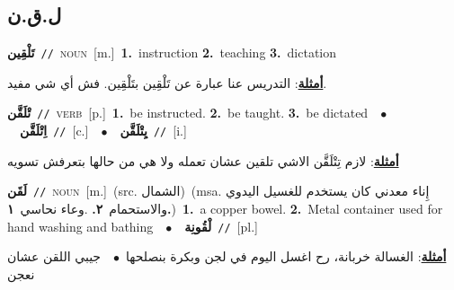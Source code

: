 \documentclass[10pt,a4paper,twoside]{article} %
\begin{document}
\begin{multicols}{2}
\vspace{-3mm}
\subsection*{\color{blue}\foreignlanguage{arabic}{ل.ق.ن}\color{blue}{}} 

{\setlength\topsep{0pt}\textbf{\foreignlanguage{arabic}{تَلْقِين}}\ {\color{gray}\texttt{//}\color{black}}\ \textsc{noun}\ [m.]\ \textbf{1.}~instruction  \textbf{2.}~teaching  \textbf{3.}~dictation\  \begin{flushright}\color{gray}\foreignlanguage{arabic}{\textbf{\underline{\foreignlanguage{arabic}{أمثلة}}}: التدريس عنا عبارة عن تَلْقِين بتَلْقِين. فش أي شي مفيد.}\end{flushright}\color{black}} \vspace{2mm}

{\setlength\topsep{0pt}\textbf{\foreignlanguage{arabic}{تْلَقَّن}}\ {\color{gray}\texttt{//}\color{black}}\ \textsc{verb}\ [p.]\ \textbf{1.}~be instructed.  \textbf{2.}~be taught.  \textbf{3.}~be dictated\ \ $\bullet$\ \ \setlength\topsep{0pt}\textbf{\foreignlanguage{arabic}{اِتْلَقَّن}}\ {\color{gray}\texttt{//}\color{black}}\ [c.]\ \ $\bullet$\ \ \setlength\topsep{0pt}\textbf{\foreignlanguage{arabic}{يِتْلَقَّن}}\ {\color{gray}\texttt{//}\color{black}}\ [i.]\  \begin{flushright}\color{gray}\foreignlanguage{arabic}{\textbf{\underline{\foreignlanguage{arabic}{أمثلة}}}: لازم تِتْلَقَّن الاشي تلقين عشان تعمله ولا هي من حالها بتعرفش تسويه}\end{flushright}\color{black}} \vspace{2mm}

{\setlength\topsep{0pt}\textbf{\foreignlanguage{arabic}{لَقَن}}\ {\color{gray}\texttt{//}\color{black}}\ \textsc{noun}\ [m.]\ (src. \color{gray}\foreignlanguage{arabic}{الشمال}\color{black})\ \color{gray}(msa. \foreignlanguage{arabic}{إِناء معدني كان يستخدم للغسيل اليدوي والاستحمام}~\foreignlanguage{arabic}{\textbf{٢.}}  .\foreignlanguage{arabic}{وعاء نحاسي}~\foreignlanguage{arabic}{\textbf{١.}})\color{black}\ \textbf{1.}~a copper bowel.  \textbf{2.}~Metal container used for hand washing and bathing\ \ $\bullet$\ \ \setlength\topsep{0pt}\textbf{\foreignlanguage{arabic}{لْقُونِة}}\ {\color{gray}\texttt{//}\color{black}}\ [pl.]\  \begin{flushright}\color{gray}\foreignlanguage{arabic}{\textbf{\underline{\foreignlanguage{arabic}{أمثلة}}}: الغسالة خربانة، رح اغسل اليوم في لجن وبكرة بنصلحها\ $\bullet$\ \  جيبي اللقن عشان نعجن}\end{flushright}\color{black}} \vspace{2mm}


\end{multicols}
\end{document}
